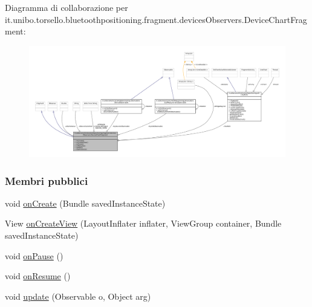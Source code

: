 Diagramma di collaborazione per it.\+unibo.\+torsello.\+bluetoothpositioning.\+fragment.\+devices\+Observers.\+Device\+Chart\+Fragment\+:
\nopagebreak
\begin{figure}[H]
\begin{center}
\leavevmode
\includegraphics[width=350pt]{classit_1_1unibo_1_1torsello_1_1bluetoothpositioning_1_1fragment_1_1devicesObservers_1_1DeviceChartFragment__coll__graph}
\end{center}
\end{figure}
\subsubsection*{Membri pubblici}
\begin{DoxyCompactItemize}
\item 
void \hyperlink{classit_1_1unibo_1_1torsello_1_1bluetoothpositioning_1_1fragment_1_1devicesObservers_1_1DeviceChartFragment_a2941a5d389e0ab2c21cb96a61ba72dca_a2941a5d389e0ab2c21cb96a61ba72dca}{on\+Create} (Bundle saved\+Instance\+State)
\item 
View \hyperlink{classit_1_1unibo_1_1torsello_1_1bluetoothpositioning_1_1fragment_1_1devicesObservers_1_1DeviceChartFragment_aa9ea67b08976eaaa04d7fa197a8fe562_aa9ea67b08976eaaa04d7fa197a8fe562}{on\+Create\+View} (Layout\+Inflater inflater, View\+Group container, Bundle saved\+Instance\+State)
\item 
void \hyperlink{classit_1_1unibo_1_1torsello_1_1bluetoothpositioning_1_1fragment_1_1devicesObservers_1_1DeviceChartFragment_a25bf98c9a715f133efd2f25b2f8aeb38_a25bf98c9a715f133efd2f25b2f8aeb38}{on\+Pause} ()
\item 
void \hyperlink{classit_1_1unibo_1_1torsello_1_1bluetoothpositioning_1_1fragment_1_1devicesObservers_1_1DeviceChartFragment_ae76428fde174d312bed28057f3f66d46_ae76428fde174d312bed28057f3f66d46}{on\+Resume} ()
\item 
void \hyperlink{classit_1_1unibo_1_1torsello_1_1bluetoothpositioning_1_1fragment_1_1devicesObservers_1_1DeviceChartFragment_a83fb3f76a108192b8df7640cfafcd98d_a83fb3f76a108192b8df7640cfafcd98d}{update} (Observable o, Object arg)
\end{DoxyCompactItemize}
